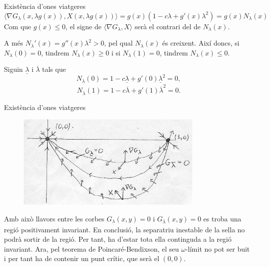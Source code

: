 \documentclass{beamer}
\theoremstyle{definition}
\begin{document}
\begin{frame}{Exist\`{e}ncia d'ones viatgeres}
\[\langle\nabla G_{\lambda}(x,\lambda g(x)),X(x,\lambda g(x))\rangle=g(x)(1-c\lambda+g'(x)\lambda^2)=g(x)N_{\lambda}(x)\]
\pause
Com que $g(x)\leq0$, el signe de $\langle\nabla G_{\lambda},X\rangle$ ser\`{a} el contrari del de $N_{\lambda}(x)$.
\pause

A m\'{e}s $N_{\lambda}'(x)=g''(x)\lambda^2>0$, pel qual $N_{\lambda}(x)$ \'{e}s creixent. Aix\'{i} doncs, si $N_{\lambda}(0)=0$, tindrem $N_{\lambda}(x)\geq0$ i si $N_{\lambda}(1)=0$, tindrem $N_{\lambda}(x)\leq0$.
\pause

Siguin $\underline\lambda$ i $\overline\lambda$ tals que
\[N_{\underline\lambda}(0)=1-c\underline\lambda+g'(0)\underline\lambda^2=0,\]
\[N_{\overline\lambda}(1)=1-c\overline\lambda+g'(1)\overline\lambda^2=0.\]
\end{frame}

\begin{frame}{Exist\`{e}ncia d'ones viatgeres}
\begin{figure}[ht!]
\begin{center}
\includegraphics[width=9cm]{Lluna.jpg}
\end{center}
\end{figure}
Amb aix\`{o} llavors entre les corbes $G_{\underline\lambda}(x,y)=0$ i $G_{\overline\lambda}(x,y)=0$ es troba una regi\'{o} positivament invariant. En conclusi\'{o}, la separatriu inestable de la sella no podr\`{a} sortir de la regi\'{o}. Per tant, ha d'estar tota ella continguda a la regi\'{o} invariant. \pause Ara, pel teorema de Poincar\'{e}-Bendixson, el seu $\omega$-l\'{i}mit no pot ser buit i per tant ha de contenir un punt cr\'{i}tic, que ser\`{a} el $(0,0)$.
\end{frame}
\end{document}

